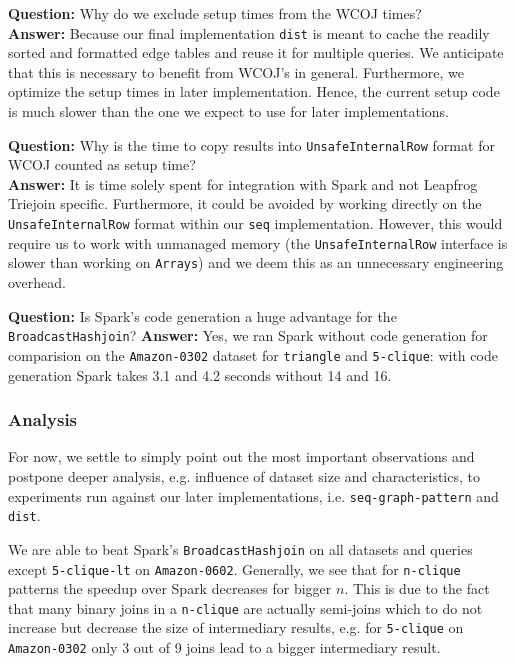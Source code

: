 \textbf{Question:} Why do we exclude setup times from the WCOJ times?\\
\textbf{Answer:} Because our final implementation \texttt{dist} is meant to cache the readily sorted and formatted edge tables and reuse it for multiple queries.
We anticipate that this is necessary to benefit from WCOJ's in general.
Furthermore, we optimize the setup times in later implementation.
Hence, the current setup code is much slower than the one we expect to use for later implementations.

\textbf{Question:} Why is the time to copy results into \texttt{UnsafeInternalRow} format for WCOJ counted as setup time?\\
\textbf{Answer:} It is time solely spent for integration with Spark and not Leapfrog Triejoin specific.
Furthermore, it could be avoided by working directly on the \texttt{UnsafeInternalRow} format within our \texttt{seq} implementation.
However, this would require us to work with unmanaged memory (the \texttt{UnsafeInternalRow} interface is slower than working on \texttt{Arrays})
and we deem this as an unnecessary engineering overhead.

\textbf{Question:} Is Spark's code generation a huge advantage for the \texttt{BroadcastHashjoin}?
\textbf{Answer:} Yes, we ran Spark without code generation for comparision on the \texttt{Amazon-0302} dataset for \texttt{triangle} and
\texttt{5-clique}: with code generation Spark takes 3.1 and 4.2 seconds without 14 and 16.

\subsubsection{Analysis}\label{sssec:seq-analysis}
For now, we settle to simply point out the most important observations and postpone deeper analysis, e.g. influence of dataset size and characteristics,
to experiments run against our later implementations, i.e. \texttt{seq-graph-pattern} and \texttt{dist}.

We are able to beat Spark's \texttt{BroadcastHashjoin} on all datasets and queries except \texttt{5-clique-lt} on \texttt{Amazon-0602}.
Generally, we see that for \texttt{n-clique} patterns the speedup over Spark decreases for bigger $n$.
This is due to the fact that many binary joins in a \texttt{n-clique} are actually semi-joins which to do not increase but decrease the size of intermediary results,
e.g. for \texttt{5-clique} on \texttt{Amazon-0302} only 3 out of 9 joins lead to a bigger intermediary result.

